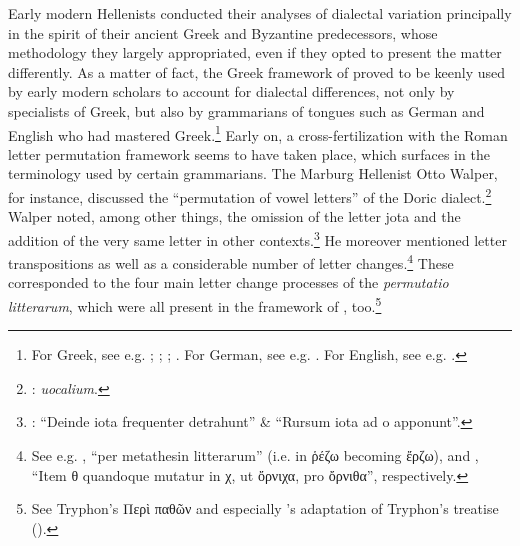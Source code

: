 Early modern Hellenists conducted their analyses of dialectal variation principally in the spirit of their ancient Greek and Byzantine predecessors, whose methodology they largely appropriated, even if they opted to present the matter differently. As a matter of fact, the Greek framework of  proved to be keenly used by early modern scholars to account for dialectal differences, not only by specialists of Greek, but also by grammarians of  tongues such as German and English who had mastered Greek.\footnote{{For Greek, see e.g. \citet[b.iv\textsc{\textsuperscript{v}}]{Melanchthon1518}; \citet[{7}{\textsc{\textsuperscript{v}}}{–11}{\textsc{\textsuperscript{v}}}]{Baile1588}; \citet[11]{Schmidt1604}; \citet[2–8, 20–22]{Hill1658}. For German, see e.g. \citet{Wolf1578}. For English, see e.g. \citet[130--133]{Gill1619}.}} Early on, a cross-fertilization with the Roman letter permutation framework seems to have taken place, which surfaces in the terminology used by certain grammarians. The Marburg Hellenist Otto Walper, for instance, discussed the “permutation of vowel letters” of the Doric dialect.\footnote{{\citet[62]{Walper1589}:} {\textit{ uocalium}}.} Walper noted, among other things, the omission of the letter jota and the addition of the very same letter in other contexts.\footnote{{\citet[63]{Walper1589}: “Deinde iota frequenter detrahunt” \& “Rursum iota ad o apponunt”.}} He moreover mentioned letter transpositions as well as a considerable number of letter changes.\footnote{{See e.g. \citet[63]{Walper1589}, “per metathesin litterarum” (i.e. in ῥέζω becoming ἔρζω), and \citet[64]{Walper1589}, “Item θ quandoque mutatur in χ, ut ὄρνιχα, pro ὄρνιθα”, respectively.}} These corresponded to the four main letter change processes of the \textit{permutatio litterarum}, which were all present in the framework of , too.\footnote{{See Tryphon’s Περὶ παθῶν and especially \citeauthor{Amerot1520}'s adaptation of Tryphon’s  treatise  (\citeyear[\textsc{p.}{iv}{\textsc{\textsuperscript{v}}}]{Amerot1520}).}}

